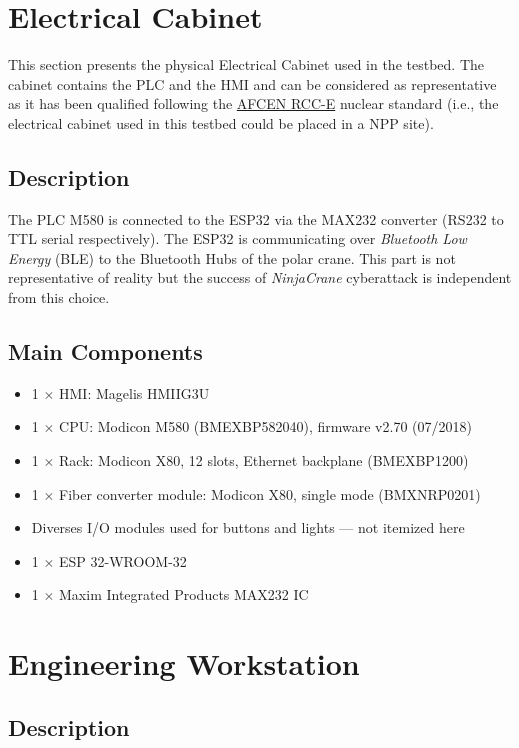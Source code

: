 \section{Electrical Cabinet}

This section presents the physical Electrical Cabinet used in the testbed. The cabinet contains the PLC and the HMI and can be considered as representative as it has been qualified following the \href{https://www.afcen.com/en/rcc-e/187-rcc-e.html}{AFCEN RCC-E} nuclear standard (i.e., the electrical cabinet used in this testbed could be placed in a NPP site). 

\subsection{Description}

The PLC M580 is connected to the ESP32 via the MAX232 converter (RS232 to TTL serial respectively). The ESP32 is communicating over \emph{Bluetooth Low Energy} (BLE) to the Bluetooth Hubs of the polar crane. This part is not representative of reality but the success of \emph{NinjaCrane} cyberattack is independent from this choice.

\subsection{Main Components}

\begin{itemize}
    \item 1 $\times$ HMI: Magelis HMIIG3U
    \item 1 $\times$ CPU: Modicon M580 (BMEXBP582040), firmware v2.70 (07/2018)
    \item 1 $\times$ Rack: Modicon X80, 12 slots, Ethernet backplane (BMEXBP1200)
    \item 1 $\times$ Fiber converter module: Modicon X80, single mode (BMXNRP0201)
    \item Diverses I/O modules used for buttons and lights — not itemized here
    \item 1 $\times$ ESP 32-WROOM-32
    \item 1 $\times$ Maxim Integrated Products MAX232 IC
\end{itemize}


\section{Engineering Workstation}

\subsection{Description}

